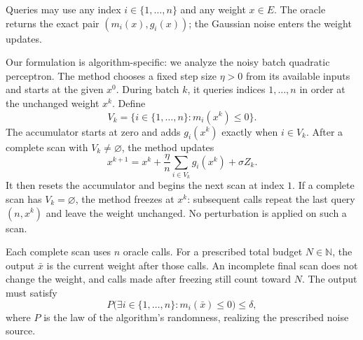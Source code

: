\documentclass[10pt]{article}
\theoremstyle{definition}
\begin{document}
Queries may use any index $i\in\{1,\ldots,n\}$ and any weight $x\in E$. The oracle returns the exact pair $(m_i(x),g_i(x))$; the Gaussian noise enters the weight updates.

Our formulation is algorithm-specific: we analyze the noisy batch quadratic perceptron. The method chooses a fixed step size $\eta>0$ from its available inputs and starts at the given $x^0$. During batch $k$, it queries indices $1,\ldots,n$ in order at the unchanged weight $x^k$. Define
\[
V_k=\{i\in\{1,\ldots,n\}:m_i(x^k)\leq0\}.
\]
The accumulator starts at zero and adds $g_i(x^k)$ exactly when $i\in V_k$. After a complete scan with $V_k\ne\varnothing$, the method updates
\[
x^{k+1}=x^k+\frac{\eta}{n}\sum_{i\in V_k}g_i(x^k)+\sigma Z_k.
\]
It then resets the accumulator and begins the next scan at index $1$. If a complete scan has $V_k=\varnothing$, the method freezes at $x^k$: subsequent calls repeat the last query $(n,x^k)$ and leave the weight unchanged. No perturbation is applied on such a scan.

Each complete scan uses $n$ oracle calls. For a prescribed total budget $N\in\mathbb{N}$, the output $\bar{x}$ is the current weight after those calls. An incomplete final scan does not change the weight, and calls made after freezing still count toward $N$. The output must satisfy
\[
P\bigl(\exists i\in\{1,\ldots,n\}:m_i(\bar{x})\leq0\bigr)
\leq\delta,
\]
where $P$ is the law of the algorithm's randomness, realizing the prescribed noise source.
\end{document}
